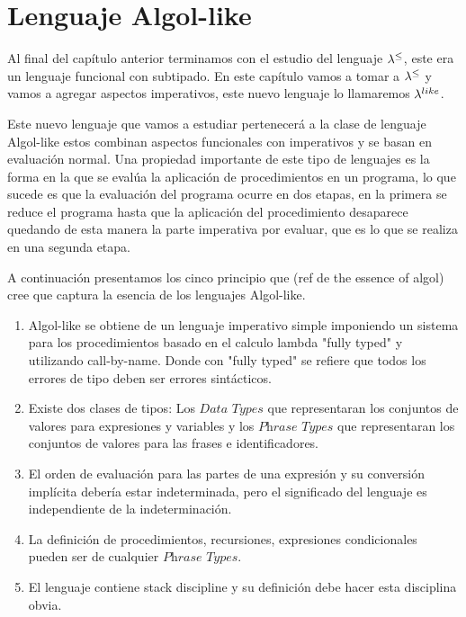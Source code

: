 \chapter{Lenguaje Algol-like}
\label{chap:algollike}

Al final del cap\'itulo anterior terminamos con el estudio
del lenguaje $\lambda^{\leq}$, este era un lenguaje funcional con subtipado.
En este cap\'itulo vamos a tomar a $\lambda^{\leq}$ y vamos a agregar
aspectos imperativos, este nuevo lenguaje lo llamaremos $\lambda^{like}$.

Este nuevo lenguaje que vamos a estudiar pertenecer\'a a la clase
de lenguaje Algol-like estos combinan
aspectos funcionales con imperativos y se basan en evaluaci\'on
normal. Una propiedad importante de este tipo de lenguajes es
la forma en la que se eval\'ua la aplicaci\'on de procedimientos
en un programa, lo que sucede es que la evaluaci\'on del programa
ocurre en dos etapas, en la primera se reduce el programa hasta que
la aplicaci\'on del procedimiento desaparece quedando de esta manera 
la parte imperativa por evaluar, que es lo que se realiza en una segunda
etapa.

A continuaci\'on presentamos los cinco principio que (ref de the essence of algol)
cree que captura la esencia de los lenguajes Algol-like.

\begin{enumerate}
\item Algol-like se obtiene de un lenguaje imperativo simple imponiendo un
sistema para los procedimientos basado en el calculo lambda "fully typed" y utilizando
call-by-name. Donde con "fully typed" se refiere que todos los errores de tipo deben ser
errores sint\'acticos.

\item Existe dos clases de tipos: Los $\textit{Data Types}$ que representaran los 
conjuntos de valores para expresiones y variables y los $\textit{Phrase Types}$ que
representaran los conjuntos de valores para las frases e identificadores.

\item El orden de evaluaci\'on para las partes de una expresi\'on y su
conversi\'on impl\'icita deber\'ia estar indeterminada, pero el significado
del lenguaje es independiente de la indeterminaci\'on.

\item La definici\'on de procedimientos, recursiones, expresiones condicionales
pueden ser de cualquier $\textit{Phrase Types}$.

\item El lenguaje contiene stack discipline y su definici\'on debe hacer esta disciplina
obvia.

\end{enumerate}


